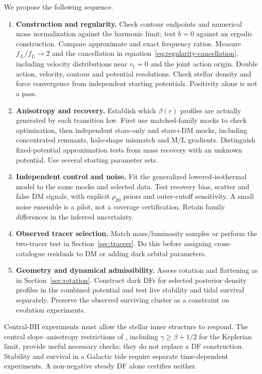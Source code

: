 \documentclass[11pt,a4paper]{article}
\begin{document}
We propose the following sequence.
\begin{enumerate}
\item \textbf{Construction and regularity.} Check contour endpoints and
numerical mass normalization against the harmonic limit; test $b=0$ against
an ergodic construction. Compare approximate and exact frequency ratios.
Measure $f_{J_r}/f_L\to2$ and the cancellation in
 equation~\eqref{eq:regularity-cancellation}, including velocity distributions
near $v_t=0$ and the joint action origin. Double action, velocity, contour
and potential resolutions. Check stellar density and force convergence from
independent starting potentials. Positivity alone is not a pass.
\item \textbf{Anisotropy and recovery.} Establish which $\beta(r)$ profiles
are actually generated by each transition law. First use matched-family
mocks to check optimization, then independent stars-only and stars+DM mocks,
including concentrated remnants, halo-shape mismatch and M/L gradients.
Distinguish fixed-potential approximation tests from mass recovery with an
unknown potential. Use several starting parameter sets.
\item \textbf{Independent control and noise.} Fit the generalized
lowered-isothermal model to the same mocks and selected data. Test recovery
bias, scatter and false DM signals, with explicit $\rho_{20}$ priors and
outer-cutoff sensitivity. A small noise ensemble is a pilot, not a coverage
certification. Retain family differences in the inferred uncertainty.
\item \textbf{Observed tracer selection.} Match mass/luminosity samples or
perform the two-tracer test in Section~\ref{sec:tracers}. Do this before
assigning cross-catalogue residuals to DM or adding dark orbital parameters.
\item \textbf{Geometry and dynamical admissibility.} Assess rotation and
flattening as in Section~\ref{sec:rotation}. Construct dark DFs for selected
posterior density profiles in the combined potential and test live stability
and tidal survival separately. Preserve the observed surviving cluster as a
constraint on evolution experiments.
\end{enumerate}

Central-BH experiments must allow the stellar inner structure to respond.
The central slope--anisotropy restrictions of
\citet{2006ApJ...642..752A}, including $\gamma\geq\beta+1/2$ for the
Keplerian limit, provide useful necessary checks; they do not replace a DF
construction. Stability and survival in a Galactic tide require separate
time-dependent experiments. A non-negative steady DF alone certifies neither.
\end{document}
